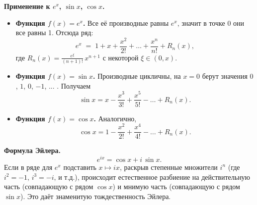 \begin{customexample}
	\textbf{Применение к $e^x$, $\sin x$, $\cos x$.}
	\begin{itemize}
		\item \textbf{Функция $f(x)=e^x$.}
		      Все её производные равны $e^x$, значит в точке 0 они все равны 1.
		      Отсюда ряд:
		      \[
			      e^x
			      \;=\;
			      1
			      + x
			      + \frac{x^2}{2!}
			      + \dots
			      + \frac{x^n}{n!}
			      + R_n(x),
		      \]
		      где $R_n(x)=\frac{e^\xi}{(n+1)!}\,x^{n+1}$ с некоторой $\xi\in(0,x)$.
		\item \textbf{Функция $f(x)=\sin x$.}
		      Производные цикличны, на $x=0$ берут значения $0$, $1$, $0$, $-1$, ... .
		      Получаем
		      \[
			      \sin x
			      = x - \frac{x^3}{3!} + \frac{x^5}{5!} - \dots + R_n(x).
		      \]
		\item \textbf{Функция $f(x)=\cos x$.}
		      Аналогично,
		      \[
			      \cos x
			      = 1 - \frac{x^2}{2!} + \frac{x^4}{4!} - \dots + R_n(x).
		      \]
	\end{itemize}
\end{customexample}

\begin{customexample}
	\textbf{Формула Эйлера.}
	\[
		e^{i x} = \cos x + i\,\sin x.
	\]
	Если в ряде для $e^x$ подставить $x\mapsto i x$, раскрыв степенные множители $i^n$ (где $i^2=-1$, $i^3=-i$, и т.д.), происходит естественное разбиение на действительную часть (совпадающую с рядом $\cos x$) и мнимую часть (совпадающую с рядом $\sin x$).
	Это даёт знаменитую тождественность Эйлера.
\end{customexample}
